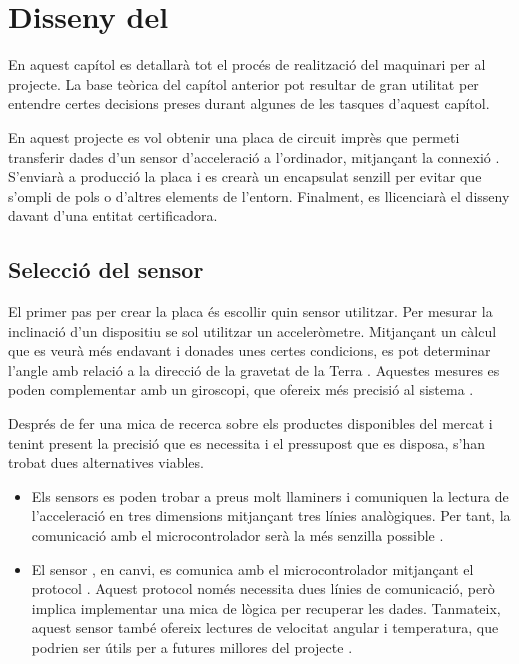 \chapter{Disseny del }

En aquest capítol es detallarà tot el procés de realització del maquinari per
al projecte. La base teòrica del capítol anterior pot resultar de gran utilitat
per entendre certes decisions preses durant algunes de les tasques d'aquest
capítol.

En aquest projecte es vol obtenir una placa de circuit imprès que permeti
transferir dades d'un sensor d'acceleració a l'ordinador, mitjançant la connexió
. S'enviarà a producció la placa i es crearà un encapsulat senzill per
evitar que s'ompli de pols o d'altres elements de l'entorn.
Finalment, es llicenciarà el disseny davant d'una entitat certificadora.

\section{Selecció del sensor}
\label{sec:sensor_selection}

El primer pas per crear la placa és escollir quin sensor utilitzar. Per
mesurar la inclinació d'un dispositiu se sol utilitzar un acceleròmetre.
Mitjançant un càlcul que es veurà més endavant i donades unes certes condicions, 
es pot determinar l'angle amb relació a la direcció de la gravetat de la Terra
\cite{PedleyTilt}.
Aquestes mesures es poden complementar amb un giroscopi, que ofereix més
precisió al sistema \cite{6702711}.

Després de fer una mica de recerca sobre els productes disponibles del mercat
i tenint present la precisió que es necessita i el pressupost que es disposa,
s'han trobat dues alternatives viables.

\begin{itemize}
    \item Els sensors  es poden trobar a preus molt llaminers i
    comuniquen la lectura de l'acceleració en tres dimensions mitjançant tres 
    línies analògiques. Per tant, la comunicació amb el microcontrolador serà la 
    més senzilla possible \cite{adxl335}.
    \item El sensor , en canvi, es comunica amb el microcontrolador
    mitjançant el protocol . Aquest protocol només necessita dues
    línies de comunicació, però implica implementar una mica de lògica per
    recuperar les dades. Tanmateix, aquest sensor també ofereix lectures de
    velocitat angular i temperatura, que podrien ser útils per a futures
    millores del projecte \cite{mpu6050specs}.
\end{itemize}

